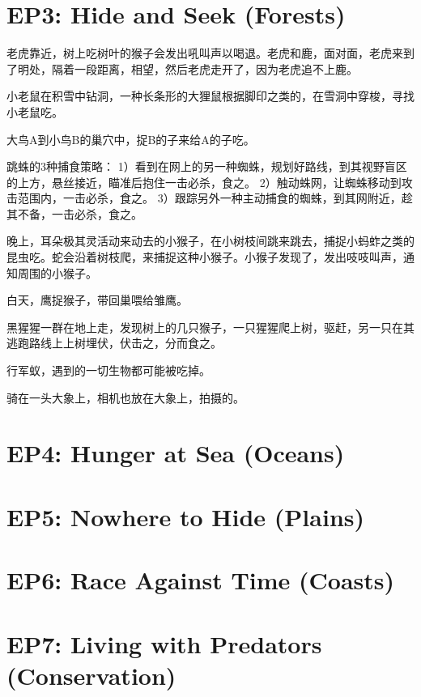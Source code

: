\documentclass[UTF8]{../../../../RepresentationUniverse}
\begin{document}
\chapter{EP3: Hide and Seek (Forests)}

老虎靠近，树上吃树叶的猴子会发出吼叫声以喝退。老虎和鹿，面对面，老虎来到了明处，隔着一段距离，相望，然后老虎走开了，因为老虎追不上鹿。

小老鼠在积雪中钻洞，一种长条形的大狸鼠根据脚印之类的，在雪洞中穿梭，寻找小老鼠吃。

大鸟A到小鸟B的巢穴中，捉B的子来给A的子吃。

跳蛛的3种捕食策略：
1）看到在网上的另一种蜘蛛，规划好路线，到其视野盲区的上方，悬丝接近，瞄准后抱住一击必杀，食之。
2）触动蛛网，让蜘蛛移动到攻击范围内，一击必杀，食之。
3）跟踪另外一种主动捕食的蜘蛛，到其网附近，趁其不备，一击必杀，食之。

晚上，耳朵极其灵活动来动去的小猴子，在小树枝间跳来跳去，捕捉小蚂蚱之类的昆虫吃。蛇会沿着树枝爬，来捕捉这种小猴子。小猴子发现了，发出吱吱叫声，通知周围的小猴子。

白天，鹰捉猴子，带回巢喂给雏鹰。

黑猩猩一群在地上走，发现树上的几只猴子，一只猩猩爬上树，驱赶，另一只在其逃跑路线上上树埋伏，伏击之，分而食之。

行军蚁，遇到的一切生物都可能被吃掉。

骑在一头大象上，相机也放在大象上，拍摄的。


\chapter{EP4: Hunger at Sea (Oceans)}


\chapter{EP5: Nowhere to Hide (Plains)}

\chapter{EP6: Race Against Time (Coasts)}

\chapter{EP7: Living with Predators (Conservation)}
\end{document}
